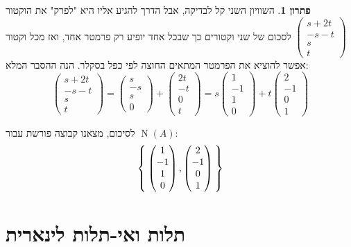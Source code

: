 \documentclass[12pt]{report}
\theoremstyle{plain}
\theoremstyle{definition}
\newtheorem*{solution}{פתרון}
\newcommand{\0}{\mathbf{0}}
\DeclareMathOperator{\Null}{N}
\begin{document}
\begin{solution}
השוויון השני קל לבדיקה, אבל הדרך להגיע אליו היא "לפרק" את הוקטור
$\begin{pmatrix}
s+2t\\
-s-t\\
s\\
t
\end{pmatrix}$
לסכום של שני וקטורים כך שבכל אחד יופיע רק פרמטר אחד, ואז מכל וקטור אפשר להוציא את הפרמטר המתאים החוצה לפי כפל בסקלר. הנה ההסבר המלא:
$$
\begin{pmatrix}
s+2t\\
-s-t\\
s\\
t
\end{pmatrix}=\begin{pmatrix}
s\\
-s\\
s\\
0
\end{pmatrix}+\begin{pmatrix}
2t\\
-t\\
0\\
t
\end{pmatrix}=s\begin{pmatrix}
1\\
-1\\
1\\
0
\end{pmatrix}+t\begin{pmatrix}
2\\
-1\\
0\\
1
\end{pmatrix}
$$

לסיכום, מצאנו קבוצה פורשת עבור
$\Null(A)$:
$$
\Set{\begin{pmatrix}
1\\
-1\\
1\\
0
\end{pmatrix},\begin{pmatrix}
2\\
-1\\
0\\
1
\end{pmatrix}}
$$

\end{solution}

\section{תלות ואי-תלות לינארית}
\end{document}
